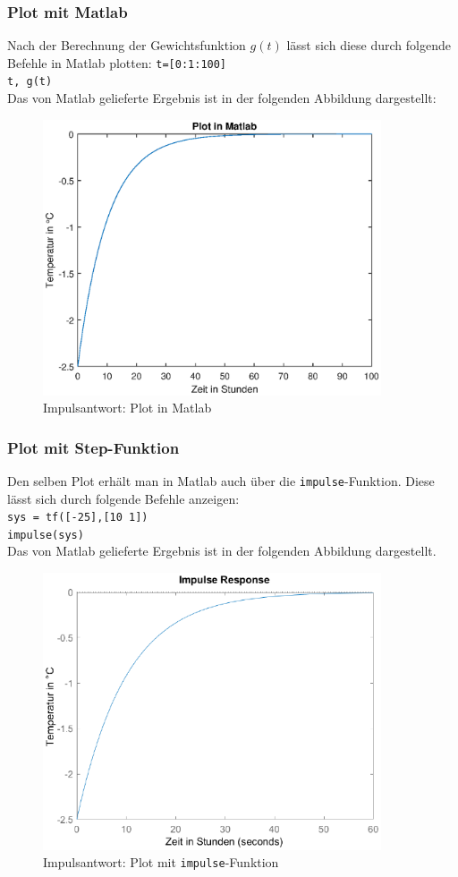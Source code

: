 \subsubsection{Plot mit Matlab}
Nach der Berechnung der Gewichtsfunktion $g(t)$ lässt sich diese durch folgende Befehle in Matlab plotten:
\texttt{t=[0:1:100]}\\
\texttt{t, g(t)}\\
Das von Matlab gelieferte Ergebnis ist in der folgenden Abbildung dargestellt:
\begin{figure}[H]
    \centering
    \includegraphics[width=10cm]{images_2/Gewichtsfunktion/gewichtsfkt_plot_mit_matlab.eps}
    \caption{Impulsantwort: Plot in Matlab}
\end{figure}

\subsubsection{Plot mit Step-Funktion}
Den selben Plot erhält man in Matlab auch über die \texttt{impulse}-Funktion. Diese lässt sich durch folgende Befehle anzeigen:\\
\hspace*{0.5cm}\texttt{sys = tf([-25],[10 1])}\\
\hspace*{0.5cm}\texttt{impulse(sys)}\\
Das von Matlab gelieferte Ergebnis ist in der folgenden Abbildung dargestellt.
\begin{figure}[H]
    \centering
    \includegraphics[width=10cm]{images_2/Gewichtsfunktion/gewichtsfkt_impulse.eps}
    \caption{Impulsantwort: Plot mit \texttt{impulse}-Funktion}
\end{figure}

